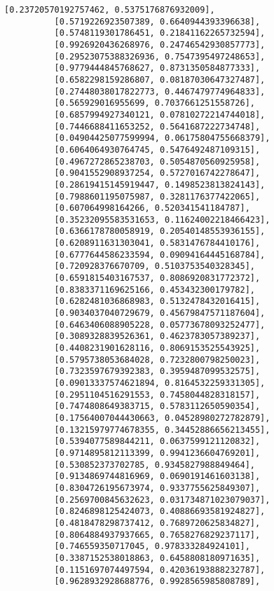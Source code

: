 \documentclass[11pt]{article}
\begin{document}
\begin{Verbatim}[commandchars=\\\{\}]
          [0.23720570192757462, 0.5375176876932009],
          [0.5719226923507389, 0.6640944393396638],
          [0.5748119301786451, 0.21841162265732594],
          [0.9926920436268976, 0.24746542930857773],
          [0.29523075388326936, 0.7547395497248653],
          [0.9779444845768627, 0.8731350584877333],
          [0.6582298159286807, 0.08187030647327487],
          [0.27448038017822773, 0.4467479774964833],
          [0.565929016955699, 0.7037661251558726],
          [0.6857994927340121, 0.07810272214744018],
          [0.7446688411653252, 0.5641687222734748],
          [0.04904425077599994, 0.06175804755668379],
          [0.6064064930764745, 0.5476492487109315],
          [0.4967272865238703, 0.5054870560925958],
          [0.9041552908937254, 0.5727016742278647],
          [0.28619415145919447, 0.1498523813824143],
          [0.7988601195075987, 0.3281176377422065],
          [0.607064998164266, 0.520341541184787],
          [0.35232095583531653, 0.11624002218466423],
          [0.6366178780058919, 0.20540148553936155],
          [0.6208911631303041, 0.5831476784410176],
          [0.6777644586233594, 0.09094164445168784],
          [0.720928376670709, 0.5103753540328345],
          [0.6591815403167537, 0.8086920831772372],
          [0.8383371169625166, 0.453432300179782],
          [0.6282481036868983, 0.5132478432016415],
          [0.9034037040729679, 0.45679847571187604],
          [0.6463406088905228, 0.05773678093252477],
          [0.3089328839526361, 0.4623783057389237],
          [0.4408231901628116, 0.8069153525543925],
          [0.5795738053684028, 0.7232800798250023],
          [0.7323597679392383, 0.3959487099532575],
          [0.09013337574621894, 0.8164532259331305],
          [0.2951104516291553, 0.7458044828318157],
          [0.7474808649383715, 0.5783112650590354],
          [0.17564007044430663, 0.04528980272782879],
          [0.13215979774678355, 0.34452886656213455],
          [0.5394077589844211, 0.0637599121120832],
          [0.9714895812113399, 0.9941236604769201],
          [0.530852373702785, 0.9345827988849464],
          [0.9134869744816969, 0.0690191461603138],
          [0.8304726195673974, 0.9337755625849307],
          [0.2569700845632623, 0.031734871023079037],
          [0.8246898125424073, 0.40886693581924827],
          [0.4818478298737412, 0.7689720625834827],
          [0.8064884937937665, 0.7658276829237117],
          [0.746559350717045, 0.978333284924101],
          [0.3387152538018863, 0.6458808180971635],
          [0.1151697074497594, 0.42036193888232787],
          [0.9628932928688776, 0.9928565985808789],

\end{Verbatim}
\end{document}

